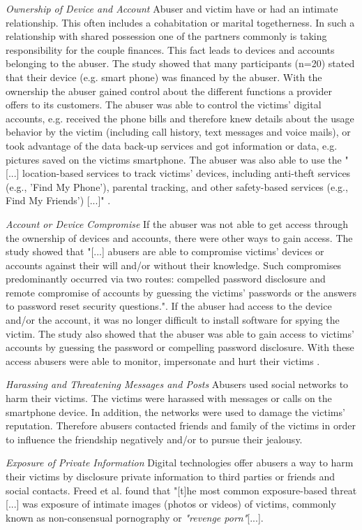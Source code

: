 \textit{Ownership of Device and Account}
Abuser and victim have or had an intimate relationship. This often includes a cohabitation or  marital togetherness. In such a relationship with shared possession one of the partners commonly is taking responsibility for the couple finances. This fact leads to devices and accounts belonging to the abuser.
The study showed that many participants (n=20) stated that their device (e.g. smart phone) was financed by the abuser. 
With the ownership the abuser gained control about the different functions a provider offers to its customers. The abuser was able to control the victims' digital accounts, e.g. received the phone bills and therefore knew details about the usage behavior by the victim (including call history, text messages and voice mails), or took advantage of the data back-up services and got information or data, e.g. pictures saved on the victims smartphone. The abuser was also able to use the "[...] location-based services to track victims' devices, including anti-theft services (e.g., 'Find My Phone'), parental tracking, and other safety-based services (e.g., Find My Friends') [...]" \cite{freed2018stalker}.

\textit{Account or Device Compromise}
If the abuser was not able to get access through the ownership of devices and accounts, there were other ways to gain access. The study showed that "[...] abusers are able to compromise victims' devices or accounts against their will and/or without their knowledge. Such compromises predominantly occurred via two routes: compelled password disclosure and remote compromise of accounts by guessing the victims' passwords or the answers to password reset security questions.". If the abuser had access to the device and/or the account, it was no longer difficult to install software for spying the victim.
The study also showed that the abuser was able to gain access to victims' accounts by guessing the password or compelling password disclosure. With these access abusers were able to monitor, impersonate and hurt their victims \cite{freed2018stalker}.

\textit{Harassing and Threatening Messages and Posts}
Abusers used social networks to harm their victims. The victims were harassed with messages or calls on the smartphone device. In addition, the networks were used to damage the victims' reputation.
Therefore abusers contacted friends and family of the victims in order to influence the friendship negatively and/or to pursue their jealousy.

\textit{Exposure of Private Information}
Digital technologies offer abusers a way to harm their victims by disclosure private information to third parties or friends and social contacts. Freed et al. found that "[t]he most common exposure-based threat [...] was exposure of intimate images (photos or videos) of victims, commonly known as non-consensual pornography or \textit{"revenge porn"}[...].

